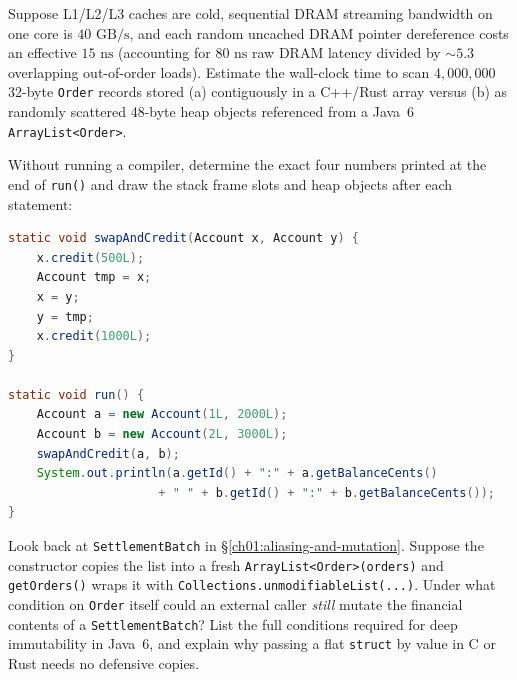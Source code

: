 \begin{exercise}
Suppose L1/L2/L3 caches are cold, sequential DRAM streaming bandwidth on one core is $40\text{ GB/s}$, and each random uncached DRAM pointer dereference costs an effective $15\text{ ns}$ (accounting for $80\text{ ns}$ raw DRAM latency divided by $\sim 5.3$ overlapping out-of-order loads). Estimate the wall-clock time to scan $4{,}000{,}000$ 32-byte \texttt{Order} records stored (a) contiguously in a C++/Rust array versus (b) as randomly scattered 48-byte heap objects referenced from a Java~6 \texttt{ArrayList<Order>}.
\end{exercise}

\begin{exercise}
Without running a compiler, determine the exact four numbers printed at the end of \texttt{run()} and draw the stack frame slots and heap objects after each statement:
\begin{lstlisting}[language=Java]
static void swapAndCredit(Account x, Account y) {
    x.credit(500L);
    Account tmp = x;
    x = y;
    y = tmp;
    x.credit(1000L);
}

static void run() {
    Account a = new Account(1L, 2000L);
    Account b = new Account(2L, 3000L);
    swapAndCredit(a, b);
    System.out.println(a.getId() + ":" + a.getBalanceCents()
                     + " " + b.getId() + ":" + b.getBalanceCents());
}
\end{lstlisting}
\end{exercise}

\begin{exercise}
Look back at \texttt{SettlementBatch} in \S\ref{ch01:aliasing-and-mutation}. Suppose the constructor copies the list into a fresh \texttt{ArrayList<Order>(orders)} and \texttt{getOrders()} wraps it with \texttt{Collections.\allowbreak unmodifiableList(...)}. Under what condition on \texttt{Order} itself could an external caller \emph{still} mutate the financial contents of a \texttt{SettlementBatch}? List the full conditions required for deep immutability in Java~6, and explain why passing a flat \texttt{struct} by value in C or Rust needs no defensive copies.
\end{exercise}

